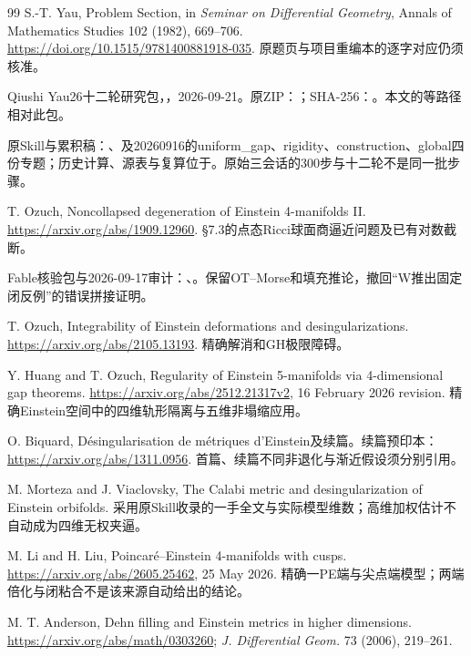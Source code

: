 \documentclass[UTF8,fontset=fandol,zihao=-4]{ctexart}
\theoremstyle{research}
\begin{document}
\begin{thebibliography}{99}
 S.-T. Yau, Problem Section, in \emph{Seminar on Differential Geometry}, Annals of Mathematics Studies 102 (1982), 669--706. \url{https://doi.org/10.1515/9781400881918-035}. 原题页与项目重编本的逐字对应仍须核准。

 Qiushi Yau26十二轮研究包，，2026-09-21。原ZIP：；SHA-256：。本文的等路径相对此包。

 原Skill与累积稿：、及20260916的uniform\_gap、rigidity、construction、global四份专题；历史计算、源表与复算位于。原始三会话的300步与十二轮不是同一批步骤。

 T. Ozuch, Noncollapsed degeneration of Einstein 4-manifolds II. \url{https://arxiv.org/abs/1909.12960}. §7.3的点态Ricci球面商逼近问题及已有对数截断。

 Fable核验包与2026-09-17审计：、。保留OT--Morse和填充推论，撤回“W推出固定闭反例”的错误拼接证明。

 T. Ozuch, Integrability of Einstein deformations and desingularizations. \url{https://arxiv.org/abs/2105.13193}. 精确解消和GH极限障碍。

 Y. Huang and T. Ozuch, Regularity of Einstein 5-manifolds via 4-dimensional gap theorems. \url{https://arxiv.org/abs/2512.21317v2}, 16 February 2026 revision. 精确Einstein空间中的四维轨形隔离与五维非塌缩应用。

 O. Biquard, Désingularisation de métriques d’Einstein及续篇。续篇预印本：\url{https://arxiv.org/abs/1311.0956}. 首篇、续篇不同非退化与渐近假设须分别引用。

 M. Morteza and J. Viaclovsky, The Calabi metric and desingularization of Einstein orbifolds. 采用原Skill收录的一手全文与实际模型维数；高维加权估计不自动成为四维无权夹逼。

 M. Li and H. Liu, Poincaré--Einstein 4-manifolds with cusps. \url{https://arxiv.org/abs/2605.25462}, 25 May 2026. 精确一PE端与尖点端模型；两端倍化与闭粘合不是该来源自动给出的结论。

 M. T. Anderson, Dehn filling and Einstein metrics in higher dimensions. \url{https://arxiv.org/abs/math/0303260}; \emph{J. Differential Geom.} 73 (2006), 219--261.


\end{thebibliography}
\end{document}
